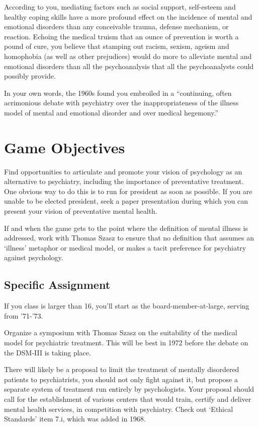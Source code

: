According to you, mediating factors such as social support, self-esteem and healthy coping skills have a more profound effect on the incidence of mental and emotional disorders than any conceivable trauma, defense mechanism, or reaction. Echoing the medical truism that an ounce of prevention is worth a pound of cure, you believe that stamping out racism, sexism, ageism and homophobia (as well as other prejudices) would do more to alleviate mental and emotional disorders than all the psychoanalysis that all the psychoanalysts could possibly provide.

In your own words, the 1960s found you embroiled in a ``continuing, often acrimonious debate with psychiatry over the inappropriateness of the illness model of mental and emotional disorder and over medical hegemony.''

\section{Game Objectives}
\label{gameobjectives}

Find opportunities to articulate and promote your vision of psychology as an alternative to psychiatry, including the importance of preventative treatment. One obvious way to do this is to run for president as soon as possible. If you are unable to be elected president, seek a paper presentation during which you can present your vision of preventative mental health.

If and when the game gets to the point where the definition of mental illness is addressed, work with Thomas Szasz to ensure that no definition that assumes an `illness' metaphor or medical model, or makes a tacit preference for psychiatry against psychology.

\subsection{Specific Assignment}
\label{specificassignment}

If you class is larger than 16, you'll start as the board-member-at-large, serving from '71-'73.

Organize a symposium with Thomas Szasz on the suitability of the medical model for psychiatric treatment. This will be best in 1972 before the debate on the DSM-III is taking place.

There will likely be a proposal to limit the treatment of mentally disordered patients to psychiatrists, you should not only fight against it, but propose a separate system of treatment run entirely by psychologists. Your proposal should call for the establishment of various centers that would train, certify and deliver mental health services, in competition with psychiatry. Check out `Ethical Standards' item 7.i, which was added in 1968.

